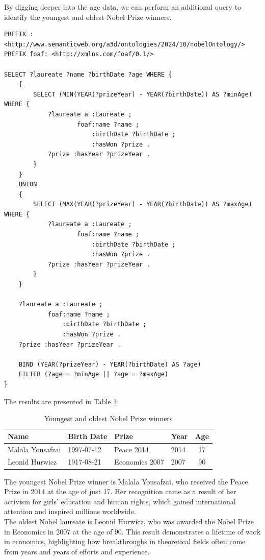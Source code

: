 \documentclass{article}
\begin{document}
\newpage

\noindent By digging deeper into the age data, we can perform an additional query to identify the youngest and oldest
Nobel Prize winners.

\begin{lstlisting}
PREFIX : <http://www.semanticweb.org/a3d/ontologies/2024/10/nobelOntology/>
PREFIX foaf: <http://xmlns.com/foaf/0.1/>

SELECT ?laureate ?name ?birthDate ?age WHERE {
    {
        SELECT (MIN(YEAR(?prizeYear) - YEAR(?birthDate)) AS ?minAge) WHERE {
            ?laureate a :Laureate ;
                    foaf:name ?name ;
                        :birthDate ?birthDate ;
                        :hasWon ?prize .
            ?prize :hasYear ?prizeYear .
        }
    }
    UNION
    {
        SELECT (MAX(YEAR(?prizeYear) - YEAR(?birthDate)) AS ?maxAge) WHERE {
            ?laureate a :Laureate ;
                    foaf:name ?name ;
                        :birthDate ?birthDate ;
                        :hasWon ?prize .
            ?prize :hasYear ?prizeYear .
        }
    }

    ?laureate a :Laureate ;
            foaf:name ?name ;
                :birthDate ?birthDate ;
                :hasWon ?prize .
    ?prize :hasYear ?prizeYear .

    BIND (YEAR(?prizeYear) - YEAR(?birthDate) AS ?age)
    FILTER (?age = ?minAge || ?age = ?maxAge)
}
\end{lstlisting}

The results are presented in Table \ref{tab:youngest_oldest}:

\begin{table}[H]
	\centering
	\caption{Youngest and oldest Nobel Prize winners}
	\begin{tabular}{|l|l|l|l|c|}
		\hline
		\textbf{Name}    & \textbf{Birth Date} & \textbf{Prize} & \textbf{Year} & \textbf{Age} \\ \hline
		Malala Yousafzai & 1997-07-12          & Peace 2014     & 2014          & 17           \\ \hline
		Leonid Hurwicz   & 1917-08-21          & Economics 2007 & 2007          & 90           \\ \hline
	\end{tabular}
	\label{tab:youngest_oldest}
\end{table}

The youngest Nobel Prize winner is Malala Yousafzai, who received the Peace Prize in 2014 at the age of just 17.
Her recognition came as a result of her activism for girls' education and human rights, which gained international
attention and inspired millions worldwide.\\
The oldest Nobel laureate is Leonid Hurwicz, who was awarded the Nobel Prize in Economics in 2007 at the age of 90.
This result demonstrates a lifetime of work in economics, highlighting how breakthroughs in theoretical fields
often come from years and years of efforts and experience.
\end{document}
